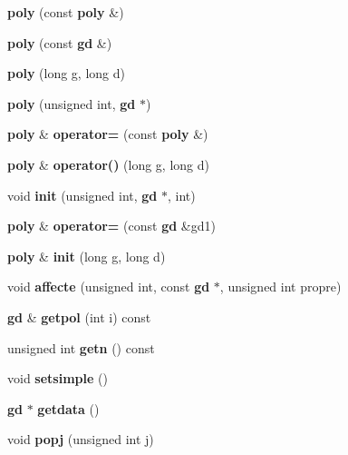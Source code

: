 \begin{DoxyCompactItemize}
\item 
\mbox{\label{classmmgd_1_1poly_aeda6ade4af424598ef30767c990a6dea}} 
{\bfseries poly} (const \textbf{ poly} \&)
\item 
\mbox{\label{classmmgd_1_1poly_ad382086366b79f689dbd7928ecdfdbb5}} 
{\bfseries poly} (const \textbf{ gd} \&)
\item 
\mbox{\label{classmmgd_1_1poly_a133a3b2591c6b3a15a4d4fe03ef3599c}} 
{\bfseries poly} (long g, long d)
\item 
\mbox{\label{classmmgd_1_1poly_a06487929da588e96a1f63503bad5cd9d}} 
{\bfseries poly} (unsigned int, \textbf{ gd} $\ast$)
\item 
\mbox{\label{classmmgd_1_1poly_af50d8c093623cf0101bc075400b98a00}} 
\textbf{ poly} \& {\bfseries operator=} (const \textbf{ poly} \&)
\item 
\mbox{\label{classmmgd_1_1poly_a2a7e363a220df1de785186467cee4d3c}} 
\textbf{ poly} \& {\bfseries operator()} (long g, long d)
\item 
\mbox{\label{classmmgd_1_1poly_a5d092e747d276a8f38461a0b7d459759}} 
void {\bfseries init} (unsigned int, \textbf{ gd} $\ast$, int)
\item 
\mbox{\label{classmmgd_1_1poly_a6698f4b87eb13619b6354716f7555188}} 
\textbf{ poly} \& {\bfseries operator=} (const \textbf{ gd} \&gd1)
\item 
\mbox{\label{classmmgd_1_1poly_aabf451e52b3ce2fe3c6b51aa49d151ec}} 
\textbf{ poly} \& {\bfseries init} (long g, long d)
\item 
\mbox{\label{classmmgd_1_1poly_ad8b13c9086778f9461ae8460ecca0d28}} 
void {\bfseries affecte} (unsigned int, const \textbf{ gd} $\ast$, unsigned int propre)
\item 
\mbox{\label{classmmgd_1_1poly_ae5b5e62d2e6a5a820b71f939f4d06872}} 
\textbf{ gd} \& {\bfseries getpol} (int i) const
\item 
\mbox{\label{classmmgd_1_1poly_a2f4f968f61c7af5aff9e349f65d0da23}} 
unsigned int {\bfseries getn} () const
\item 
\mbox{\label{classmmgd_1_1poly_a5495fb6ca0d7c61bb5b206f559ffcf01}} 
void {\bfseries setsimple} ()
\item 
\mbox{\label{classmmgd_1_1poly_a18c1e001f43ce42745d7b2be6890cc3f}} 
\textbf{ gd} $\ast$ {\bfseries getdata} ()
\item 
\mbox{\label{classmmgd_1_1poly_a184a9b26eed443676f8d55919856a363}} 
void {\bfseries popj} (unsigned int j)
\item 

\end{DoxyCompactItemize}
